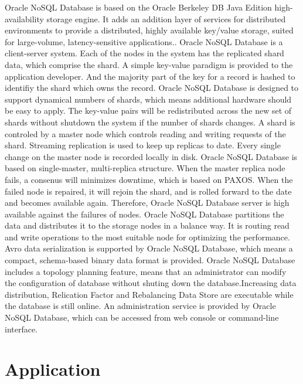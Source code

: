 Oracle NoSQL Database is based on the Oracle Berkeley DB Java Edition high-availability storage engine. It adds an addition layer of services for distributed environments to provide a distributed, highly available key/value storage, suited for large-volume, latency-sensitive applications.\cite{hid-sp18-515-editor00}.
Oracle NoSQL Database is a client-server system. Each of the nodes in the system has the replicated shard data, which comprise the shard. A simple key-value paradigm is provided to the application developer. And the majority part of the key for a record is hashed to identifiy the shard which owns the record. Oracle NoSQL Database is designed to support dynamical numbers of shards, which means additional hardware should be easy to apply. The key-value pairs will be redistributed across the new set of shards without shutdown the system if the number of shards changes. A shard is controled by a master node which controls reading and writing requests of the shard. Streaming replication is used to keep up replicas to date. Every single change on the master node is recorded locally in disk.\cite{hid-sp18-515-editor00}
Oracle NoSQL Database is based on single-master, multi-replica structure. When the master replica node fails, a consenus will minimizes downtime, which is based on PAXOS. When the failed node is repaired, it will rejoin the shard, and is rolled forward to the date and becomes available again. Therefore, Oracle NoSQL Database server is high available against the failures of nodes. \cite{hid-sp18-515-editor00}
Oracle NoSQL Database partitions the data and distributes it to the storage nodes in a balance way. It is routing read and write operations to the most suitable node for optimizing the performance.\cite{hid-sp18-515-editor00}
Avro data serialization is supported by Oracle NoSQL Database, which means a compact, schema-based binary data format is provided.\cite{hid-sp18-515-editor00}
Oracle NoSQL Database includes a topology planning feature, means that an administrator can modify the configuration of database without shuting down the database.Increasing data distribution, Relication Factor and Rebalancing Data Store are executable while the database is still online. \cite{hid-sp18-515-editor00}
An administration service is provided by Oracle NoSQL Database, which can be accessed from web console or command-line interface. \cite{hid-sp18-515-editor00}


\section{Application}

